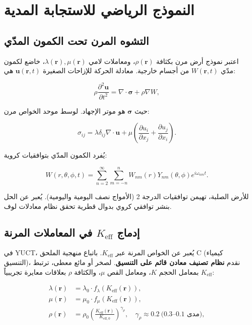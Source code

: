 \documentclass[12pt,a4paper]{article}
\newcommand{\Keff}{K_{\mathrm{eff}}}
\newcommand{\Keffzero}{K_{\mathrm{eff},0}}
\theoremstyle{remark}
\begin{document}
	\section{النموذج الرياضي للاستجابة المدية}
	\label{sec:model}
	
	\subsection{التشوه المرن تحت الكمون المدّي}
	
	اعتبر نموذج أرض مرن بكثافة \(\rho(\mathbf{r})\)، ومعاملات لامي \(\lambda(\mathbf{r}), \mu(\mathbf{r})\)، خاضع لكمون مدّي \(W(\mathbf{r},t)\) من أجسام خارجية. معادلة الحركة للإزاحات الصغيرة \(\mathbf{u}(\mathbf{r},t)\) هي:
	
	\begin{equation}
		\rho \frac{\partial^2 \mathbf{u}}{\partial t^2} = \nabla \cdot \boldsymbol{\sigma} + \rho \nabla W,
		\label{eq:motion}
	\end{equation}
	
	حيث \(\boldsymbol{\sigma}\) هو موتر الإجهاد. لوسط موحد الخواص مرن:
	
	\begin{equation}
		\sigma_{ij} = \lambda \delta_{ij} \nabla \cdot \mathbf{u} + \mu \left(\frac{\partial u_i}{\partial x_j} + \frac{\partial u_j}{\partial x_i}\right).
		\label{eq:stress}
	\end{equation}
	
	يُفرد الكمون المدّي بتوافقيات كروية:
	
	\begin{equation}
		W(r,\theta,\phi,t) = \sum_{n=2}^{\infty} \sum_{m=-n}^{n} W_{nm}(r) Y_{nm}(\theta,\phi) e^{i\omega_{nm}t}.
		\label{eq:tidal-potential}
	\end{equation}
	
	للأرض الصلبة، تهيمن توافقيات الدرجة 2 (الأمواج نصف اليومية واليومية). يُعبر عن الحل بنشر توافقي كروي بدوال قطرية تحقق نظام معادلات لوف.
	
	\subsection{إدماج \(\Keff\) في المعاملات المرنة}
	
	في YUCT، يُعبر عن الخواص المرنة عبر \(\Keff\). باتباع منهجية الملحق C (كيمياء التنسيق)، نقدم \textbf{نظام تصنيف معادن قائم على التنسيق}. لصخر أو مائع معطى، ترتبط \(\Keff\) بمعامل الحجم \(K\)، ومعامل القص \(\mu\)، والكثافة \(\rho\) بعلاقات معايرة تجريبياً:
	
	\begin{align}
		\lambda(\mathbf{r}) &= \lambda_0 \cdot f_\lambda(\Keff(\mathbf{r})), \\
		\mu(\mathbf{r}) &= \mu_0 \cdot f_\mu(\Keff(\mathbf{r})), \\
		\rho(\mathbf{r}) &= \rho_0 \left(\frac{\Keff(\mathbf{r})}{\Keffzero}\right)^{\gamma_\rho}, \quad \gamma_\rho \approx 0.2\ \text{(مدى 0.1–0.3)},
		\label{eq:keff-properties}
	\end{align}
	
\end{document}
